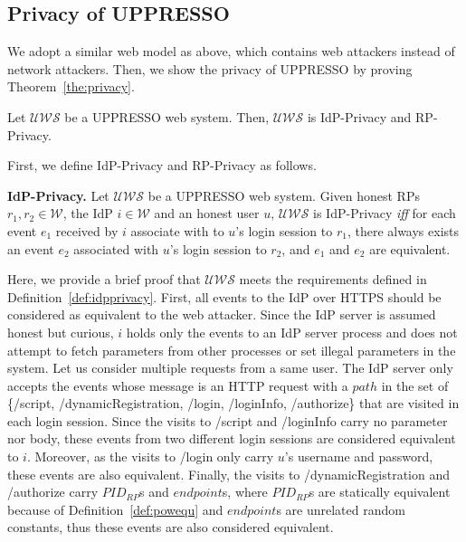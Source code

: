 \subsection{Privacy of UPPRESSO}
We adopt a similar web model as above, which contains web attackers instead of network attackers. Then, we show the privacy of UPPRESSO by proving Theorem~\ref{the:privacy}.
\begin{theorem}
Let $\mathcal{UWS}$ be a UPPRESSO web system. Then, $\mathcal{UWS}$ is IdP-Privacy and RP-Privacy.
\label{the:privacy}
\end{theorem}
\vspace{-\topsep}
First, we define IdP-Privacy and RP-Privacy as follows.
\begin{definition}
\noindent\textbf{IdP-Privacy.} Let $\mathcal{UWS}$ be a UPPRESSO web system. Given honest RPs $r_1, r_2 \in \mathcal{W}$, the IdP $i \in \mathcal{W}$ and an honest user $u$, $\mathcal{UWS}$ is IdP-Privacy {\em iff} for each event $e_1$ received by $i$ associate with to $u$'s login session to $r_1$, there always exists an event $e_2$ associated with $u$'s login session to $r_2$, and $e_1$ and $e_2$ are equivalent.
\label{def:idpprivacy}
\end{definition}
\vspace{-\topsep}
Here, we provide a brief proof that $\mathcal{UWS}$ meets the requirements defined in Definition~\ref{def:idpprivacy}. First, all events to the IdP over HTTPS should be considered as equivalent to the web attacker. Since the IdP server is assumed honest but curious, $i$ holds only the events to an IdP server process and does not attempt to fetch parameters from other processes or set illegal parameters in the system. Let us consider multiple requests from a same user. The IdP server only accepts the events whose message is an HTTP request with a $path$ in the set of {\sf \{/script, /dynamicRegistration, /login, /loginInfo, /authorize\}} that are visited in each login session. Since the visits to {\sf /script} and {\sf /loginInfo} carry no parameter nor body, these events from two different login sessions are considered equivalent to $i$. Moreover, as the visits to {\sf /login} only carry $u$'s username and password, these events are also equivalent. Finally, the visits to {\sf /dynamicRegistration} and {\sf /authorize} carry $PID_{RP}$s and $endpoint$s, where $PID_{RP}$s are statically equivalent because of Definition~\ref{def:powequ} and $endpoint$s are unrelated random constants, thus these events are also considered equivalent.
